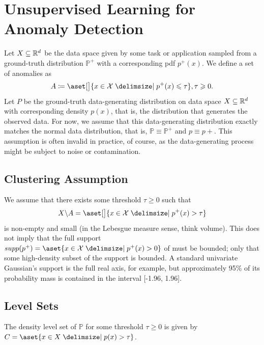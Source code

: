 \documentclass[11pt]{report}
\begin{document}


\maketitle



\section{Unsupervised Learning for Anomaly Detection}
Let $X \subseteq \mathbb{R} ^d$ be the data space given by some task
or application sampled from a ground-truth distribution $\mathbb{P}^+$ with a corresponding pdf $p^+(x)$. We define a set of anomalies as 
\begin{align} \label{anomaly_set}
    A \Let \aset[\big]{\dcv \in \mathcal{X} \suchthat p^+(x) \leq \tau}, \tau \geq 0. 
\end{align}
Let $P$ be the ground-truth data-generating distribution
on data space $X \subseteq \mathbb{R} ^d$ with corresponding density $p(x)$,
that is, the distribution that generates the observed data. For now, we assume that this data-generating distribution exactly matches the normal data distribution, that is,
$\mathbb{P} \equiv \mathbb{P}^+$ and $p \equiv p+$. This assumption is often invalid in
practice, of course, as the data-generating process might
be subject to noise or contamination. 

\subsection{Clustering Assumption}
We assume that there exists some threshold $\tau \geq 0$ such that
\begin{align}
    X \backslash A = \aset[\big]{x \in  \mathcal{X} \suchthat p^+(x)>\tau}
\end{align} is non-empty and small (in the Lebesgue measure sense, think volume). This does not imply that the full
support $supp(p^+) = \aset{x \in \mathcal{X} \suchthat p^+(x) > 0}$ of must be bounded; only that some high-density subset of
the support is bounded. A standard univariate Gaussian’s
support is the full real axis, for example, but approximately
95\% of its probability mass is contained in the interval
[-1.96, 1.96].

\subsection{Level Sets}
 The density level set of $\mathbb{P}$ for some threshold $\tau \geq 0$ is given by $C = \aset{x \in X \suchthat p(x) > \tau}$. 
 
\end{document}
